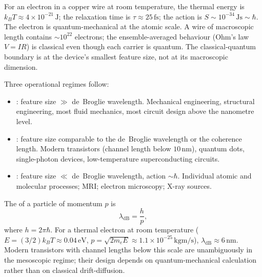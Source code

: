 For an electron in a copper wire at room temperature, the thermal
energy is $k_{B}T \approx 4\times 10^{-21}\,\si{\joule}$; the
relaxation time is $\tau \approx 25\,\si{\femto\second}$; the
action is $S \sim 10^{-34}\,\si{\joule\second} \sim \hbar$. The
electron is quantum-mechanical at the atomic scale. A wire of
macroscopic length contains $\sim 10^{22}$ electrons; the
ensemble-averaged behaviour (Ohm's law $V = IR$) is classical even
though each carrier is quantum. The classical-quantum boundary is at
the device's smallest feature size, not at its macroscopic dimension.

Three operational regimes follow:
\begin{itemize}[leftmargin=*]
  \item {}: feature size $\gg$ de~Broglie
    wavelength. Mechanical engineering, structural engineering, most
    fluid mechanics, most circuit design above the nanometre level.
  \item {}: feature size comparable to the
    de~Broglie wavelength or the coherence length. Modern transistors
    (channel length below $10\,\si{\nano\meter}$), quantum dots,
    single-photon devices, low-temperature superconducting circuits.
  \item {}: feature size $\ll$ de~Broglie
    wavelength, action $\sim \hbar$. Individual atomic and molecular
    processes; MRI; electron microscopy; X-ray sources.
\end{itemize}

The  of a particle of momentum $p$ is
\[
\lambda_{\text{dB}} = \frac{h}{p},
\]
where $h = 2\pi\hbar$. For a thermal electron at room temperature
($E = (3/2)k_{B}T \approx 0.04\,\si{\electronvolt}$, $p =
\sqrt{2m_{e}E} \approx 1.1\times 10^{-25}\,\si{\kilogram\meter\per
\second}$), $\lambda_{\text{dB}} \approx 6\,\si{\nano\meter}$. Modern
transistors with channel lengths below this scale are unambiguously
in the mesoscopic regime; their design depends on quantum-mechanical
calculation rather than on classical drift-diffusion.

